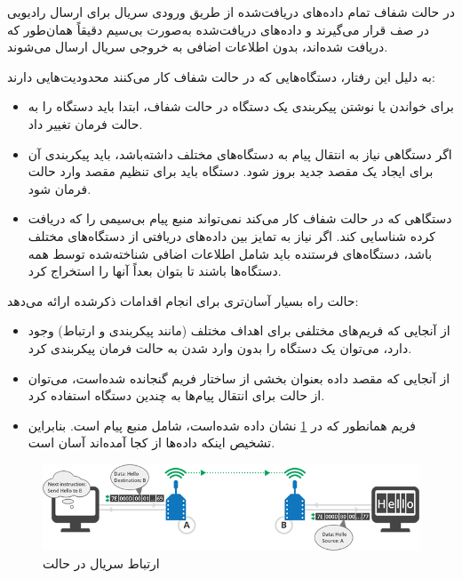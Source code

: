 در حالت شفاف تمام داده‌های دریافت‌شده از طریق ورودی سریال برای ارسال رادیویی در صف قرار می‌گیرند و داده‌های دریافت‌شده به‌صورت بی‌سیم دقیقاً همان‌طور که دریافت شده‌اند، بدون اطلاعات اضافی به خروجی سریال ارسال می‌شوند\cite{Digi}.

به دلیل این رفتار، دستگاه‌هایی که در حالت شفاف کار می‌کنند محدودیت‌هایی دارند:
\begin{itemize}
\item برای خواندن یا نوشتن پیکربندی یک دستگاه در حالت شفاف، ابتدا باید دستگاه را به حالت فرمان تغییر داد.
\item اگر دستگاهی نیاز به انتقال پیام به دستگاه‌های مختلف داشته‌باشد، باید پیکربندی آن برای ایجاد یک مقصد جدید بروز شود. دستگاه باید برای تنظیم مقصد وارد حالت فرمان شود.
\item دستگاهی که در حالت شفاف کار می‌کند نمی‌تواند منبع پیام بی‌سیمی را که دریافت کرده شناسایی کند. اگر نیاز به تمایز بین داده‌های دریافتی از دستگاه‌های مختلف باشد، دستگاه‌های فرستنده باید شامل اطلاعات اضافی شناخته‌شده توسط همه دستگاه‌ها باشند تا بتوان بعداً آنها را استخراج کرد.
\end{itemize}

حالت  راه بسیار آسان‌تری برای انجام اقدامات ذکرشده ارائه می‌دهد:

\begin{itemize}
\item از آنجایی که فریم‌های مختلفی برای اهداف مختلف (مانند پیکربندی و ارتباط) وجود دارد، می‌توان یک دستگاه را بدون وارد شدن به حالت فرمان پیکربندی کرد.
\item از آنجایی که مقصد داده بعنوان بخشی از ساختار فریم  گنجانده شده‌است، می‌توان از حالت  برای انتقال پیام‌ها به چندین دستگاه استفاده کرد. 
\item فریم  همانطور که در \cref{fig:api_mode} \cite{Digi} نشان داده شده‌است، شامل منبع پیام است. بنابراین تشخیص اینکه داده‌ها از کجا آمده‌اند آسان است.
\end{itemize}

\begin{figure}[!h]
\centering\includegraphics[scale=.7]{api_mode.png}
\caption{ارتباط سریال در حالت  \cite{Digi}}\label{fig:api_mode}
\end{figure}

